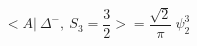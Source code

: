 \begin{equation}
<A|~\Delta^{-},~ S_3=\frac{3}{2} >= \frac{\sqrt{2}}{\pi} ~\psi_2^3
\end{equation}

